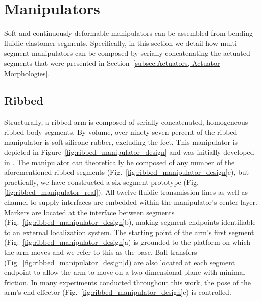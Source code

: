 \section{Manipulators}
\label{sec:Manipulators}
Soft and continuously deformable manipulators can be assembled from bending fluidic elastomer segments.
Specifically, in this section we detail how multi-segment manipulators can be composed by serially concatenating the actuated segments that were presented in Section~\ref{subsec:Actuators, Actuator Morphologies}.

\subsection{Ribbed}
\label{subsec:Manipulators, Ribbed}
Structurally, a ribbed arm is composed of serially concatenated, homogeneous ribbed body segments.
By volume, over ninety-seven percent of the ribbed manipulator is soft silicone rubber, excluding the feet.
This manipulator is depicted in Figure~\ref{fig:ribbed_manipulator_design} and was initially developed in \citet{marchese2014design}.
The manipulator can theoretically be composed of any number of the aforementioned ribbed segments (Fig.~\ref{fig:ribbed_manipulator_design}e), but practically, we have constructed a six-segment prototype (Fig. \ref{fig:ribbed_manipulator_real}).
All twelve fluidic transmission lines as well as channel-to-supply interfaces are embedded within the manipulator's center layer.
Markers are located at the interface between segments (Fig.~\ref{fig:ribbed_manipulator_design}b), making segment endpoints identifiable to an external localization system.
The starting point of the arm's first segment (Fig.~\ref{fig:ribbed_manipulator_design}a) is grounded to the platform on which the arm moves and we refer to this as the base.
Ball transfers (Fig.~\ref{fig:ribbed_manipulator_design}d) are also located at each segment endpoint to allow the arm to move on a two-dimensional plane with minimal friction.
In many experiments conducted throughout this work, the pose of the arm's end-effector (Fig.~\ref{fig:ribbed_manipulator_design}c) is controlled.

